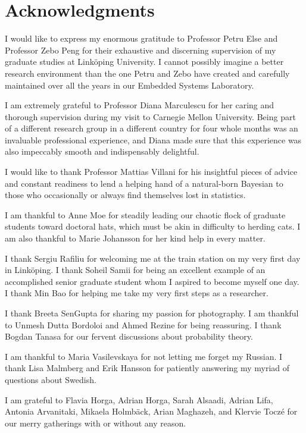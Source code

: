 \chapter*{Acknowledgments}
\newcommand\person[2]{#2 #1}

I would like to express my enormous gratitude to Professor \person{Else}{Petru}
and Professor \person{Peng}{Zebo} for their exhaustive and discerning
supervision of my graduate studies at Linköping University. I cannot possibly
imagine a better research environment than the one Petru and Zebo have created
and carefully maintained over all the years in our Embedded Systems Laboratory.

I am extremely grateful to Professor \person{Marculescu}{Diana} for her caring
and thorough supervision during my visit to Carnegie Mellon University. Being
part of a different research group in a different country for four whole months
was an invaluable professional experience, and Diana made sure that this
experience was also impeccably smooth and indispensably delightful.

I would like to thank Professor \person{Villani}{Mattias} for his insightful
pieces of advice and constant readiness to lend a helping hand of a natural-born
Bayesian to those who occasionally or always find themselves lost in statistics.

I am thankful to \person{Moe}{Anne} for steadily leading our chaotic flock of
graduate students toward doctoral hats, which must be akin in difficulty to
herding cats. I am also thankful to \person{Johansson}{Marie} for her kind help
in every matter.

I thank \person{Rafiliu}{Sergiu} for welcoming me at the train station on my
very first day in Linköping. I thank \person{Samii}{Soheil} for being an
excellent example of an accomplished senior graduate student whom I aspired to
become myself one day. I thank \person{Bao}{Min} for helping me take my very
first steps as a researcher.

I thank \person{SenGupta}{Breeta} for sharing my passion for photography. I am
thankful to \person{Dutta Bordoloi}{Unmesh} and \person{Rezine}{Ahmed} for being
reassuring. I thank \person{Tanasa}{Bogdan} for our fervent discussions about
probability theory.

I am thankful to \person{Vasilevskaya}{Maria} for not letting me forget my
Russian. I thank \person{Malmberg}{Lisa} and \person{Hansson}{Erik} for
patiently answering my myriad of questions about Swedish.

I am grateful to \person{Horga}{Flavia}, \person{Horga}{Adrian},
\person{Alsaadi}{Sarah}, \person{Lifa}{Adrian}, \person{Arvanitaki}{Antonia},
\person{Holmbäck}{Mikaela}, \person{Maghazeh}{Arian}, and
\person{Toczé}{Klervie} for our merry gatherings with or without any reason.

